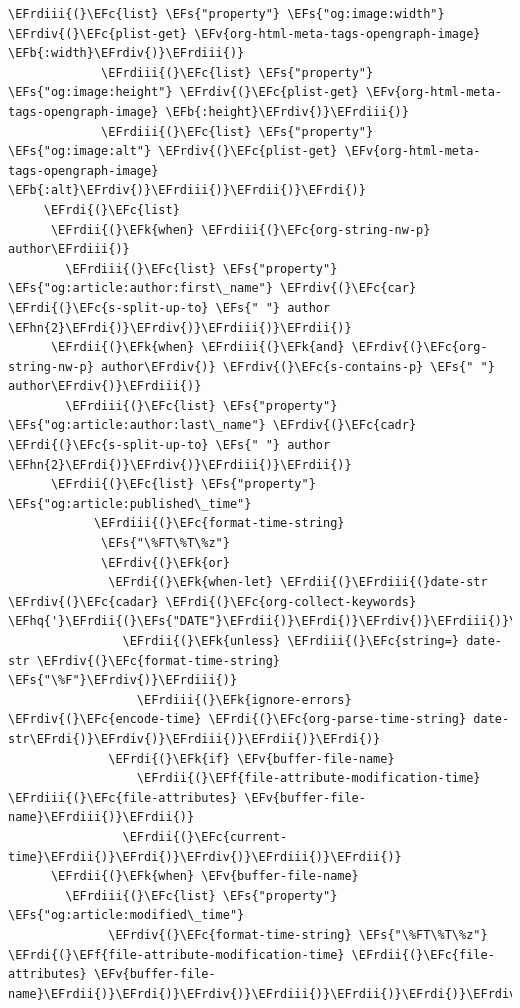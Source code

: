 \documentclass{scrartcl}
\newcommand{\EFk}[1]{\textcolor{EFk}{#1}} %
\newcommand{\EFs}[1]{\textcolor{EFs}{#1}} %
\newcommand{\EFb}[1]{\textcolor{EFb}{#1}} %
\newcommand{\EFc}[1]{\textcolor{EFc}{#1}} %
\newcommand{\EFv}[1]{\textcolor{EFv}{#1}} %
\newcommand{\EFf}[1]{\textcolor{EFf}{#1}} %
\newcommand{\EFhn}[1]{#1} %
\newcommand{\EFhq}[1]{#1} %
\newcommand{\EFrdi}[1]{#1} %
\newcommand{\EFrdii}[1]{#1} %
\newcommand{\EFrdiii}[1]{#1} %
\newcommand{\EFrdiv}[1]{#1} %
\begin{document}
\begin{Code}
\begin{Verbatim}[]
             \EFrdiii{(}\EFc{list} \EFs{"property"} \EFs{"og:image:width"} \EFrdiv{(}\EFc{plist-get} \EFv{org-html-meta-tags-opengraph-image} \EFb{:width}\EFrdiv{)}\EFrdiii{)}
             \EFrdiii{(}\EFc{list} \EFs{"property"} \EFs{"og:image:height"} \EFrdiv{(}\EFc{plist-get} \EFv{org-html-meta-tags-opengraph-image} \EFb{:height}\EFrdiv{)}\EFrdiii{)}
             \EFrdiii{(}\EFc{list} \EFs{"property"} \EFs{"og:image:alt"} \EFrdiv{(}\EFc{plist-get} \EFv{org-html-meta-tags-opengraph-image} \EFb{:alt}\EFrdiv{)}\EFrdiii{)}\EFrdii{)}\EFrdi{)}
     \EFrdi{(}\EFc{list}
      \EFrdii{(}\EFk{when} \EFrdiii{(}\EFc{org-string-nw-p} author\EFrdiii{)}
        \EFrdiii{(}\EFc{list} \EFs{"property"} \EFs{"og:article:author:first\_name"} \EFrdiv{(}\EFc{car} \EFrdi{(}\EFc{s-split-up-to} \EFs{" "} author \EFhn{2}\EFrdi{)}\EFrdiv{)}\EFrdiii{)}\EFrdii{)}
      \EFrdii{(}\EFk{when} \EFrdiii{(}\EFk{and} \EFrdiv{(}\EFc{org-string-nw-p} author\EFrdiv{)} \EFrdiv{(}\EFc{s-contains-p} \EFs{" "} author\EFrdiv{)}\EFrdiii{)}
        \EFrdiii{(}\EFc{list} \EFs{"property"} \EFs{"og:article:author:last\_name"} \EFrdiv{(}\EFc{cadr} \EFrdi{(}\EFc{s-split-up-to} \EFs{" "} author \EFhn{2}\EFrdi{)}\EFrdiv{)}\EFrdiii{)}\EFrdii{)}
      \EFrdii{(}\EFc{list} \EFs{"property"} \EFs{"og:article:published\_time"}
            \EFrdiii{(}\EFc{format-time-string}
             \EFs{"\%FT\%T\%z"}
             \EFrdiv{(}\EFk{or}
              \EFrdi{(}\EFk{when-let} \EFrdii{(}\EFrdiii{(}date-str \EFrdiv{(}\EFc{cadar} \EFrdi{(}\EFc{org-collect-keywords} \EFhq{'}\EFrdii{(}\EFs{"DATE"}\EFrdii{)}\EFrdi{)}\EFrdiv{)}\EFrdiii{)}\EFrdii{)}
                \EFrdii{(}\EFk{unless} \EFrdiii{(}\EFc{string=} date-str \EFrdiv{(}\EFc{format-time-string} \EFs{"\%F"}\EFrdiv{)}\EFrdiii{)}
                  \EFrdiii{(}\EFk{ignore-errors} \EFrdiv{(}\EFc{encode-time} \EFrdi{(}\EFc{org-parse-time-string} date-str\EFrdi{)}\EFrdiv{)}\EFrdiii{)}\EFrdii{)}\EFrdi{)}
              \EFrdi{(}\EFk{if} \EFv{buffer-file-name}
                  \EFrdii{(}\EFf{file-attribute-modification-time} \EFrdiii{(}\EFc{file-attributes} \EFv{buffer-file-name}\EFrdiii{)}\EFrdii{)}
                \EFrdii{(}\EFc{current-time}\EFrdii{)}\EFrdi{)}\EFrdiv{)}\EFrdiii{)}\EFrdii{)}
      \EFrdii{(}\EFk{when} \EFv{buffer-file-name}
        \EFrdiii{(}\EFc{list} \EFs{"property"} \EFs{"og:article:modified\_time"}
              \EFrdiv{(}\EFc{format-time-string} \EFs{"\%FT\%T\%z"} \EFrdi{(}\EFf{file-attribute-modification-time} \EFrdii{(}\EFc{file-attributes} \EFv{buffer-file-name}\EFrdii{)}\EFrdi{)}\EFrdiv{)}\EFrdiii{)}\EFrdii{)}\EFrdi{)}\EFrdiv{)}\EFrdiii{)}\EFrdii{)}


\end{Verbatim}
\end{Code}
\end{document}
